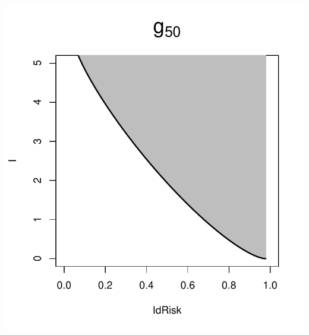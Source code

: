 \documentclass{beamer}
\begin{document}
\begin{frame}
\begin{center}
\includegraphics[scale = 0.4]{../idloss/g50.pdf}
\end{center}
\end{frame}
\end{document}
